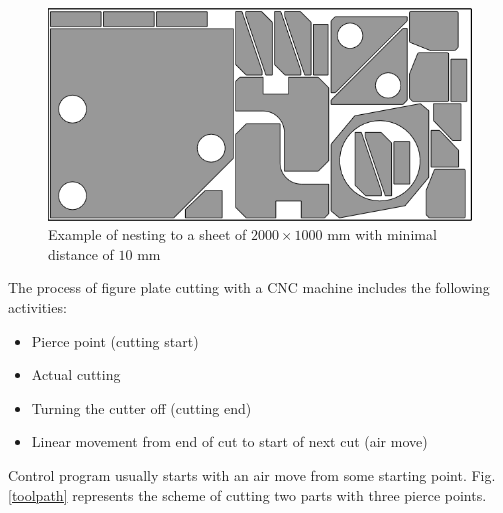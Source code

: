 \documentclass{../download/tPRS2e}
\begin{document}
\begin{figure}[h]
    \begin{center}
    \includegraphics{nesting.png}
    \caption{Example of nesting to a sheet of $2000 \times 1000$ mm
    with minimal distance of $10$ mm} \label{nesting}
    \end{center}
\end{figure}

The process of figure plate cutting with a CNC machine includes
the following activities:
\begin{itemize}
    \item{Pierce point} (cutting start)
    \item{Actual cutting}
    \item{Turning the cutter off} (cutting end)
    \item{Linear movement from end of cut to start of next cut} (air move)
\end{itemize}

Control program usually starts with an air move from
some starting point. Fig. \ref{toolpath} represents
the scheme of cutting two parts with three pierce points.
\end{document}
